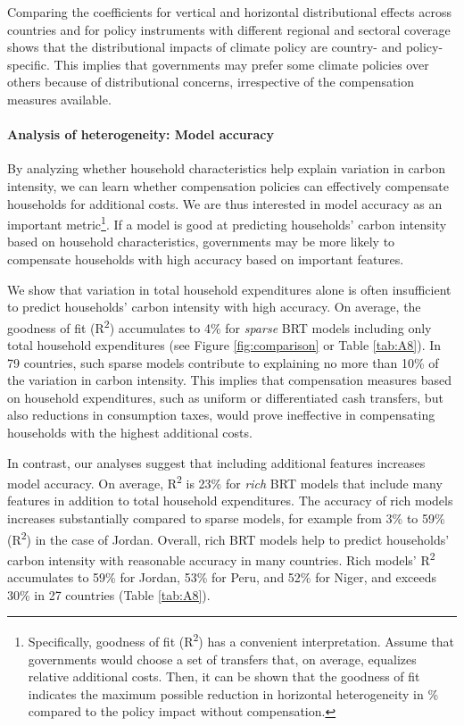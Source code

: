 \documentclass[12pt, a4paper]{article}
\begin{document}
Comparing the coefficients for vertical and horizontal distributional effects across countries and for policy instruments with different regional and sectoral coverage shows that the distributional impacts of climate policy are country- and policy-specific. This implies that governments may prefer some climate policies over others because of distributional concerns, irrespective of the compensation measures available.

\paragraph{Analysis of heterogeneity: Model accuracy} 
By analyzing whether household characteristics help explain variation in carbon intensity, we can learn whether compensation policies can effectively compensate households for additional costs. We are thus interested in model accuracy as an important metric\footnote{Specifically, goodness of fit (R\textsuperscript{2}) has a convenient interpretation. Assume that governments would choose a set of transfers that, on average, equalizes relative additional costs. Then, it can be shown that the goodness of fit indicates the maximum possible reduction in horizontal heterogeneity in \% compared to the policy impact without compensation.}. If a model is good at predicting households' carbon intensity based on household characteristics, governments may be more likely to compensate households with high accuracy based on important features. 

We show that variation in total household expenditures alone is often insufficient to predict households' carbon intensity with high accuracy. On average, the goodness of fit (R\textsuperscript{2}) accumulates to 4\% for \textit{sparse} BRT models including only total household expenditures (see Figure \ref{fig:comparison} or Table \ref{tab:A8}). In 79 countries, such sparse models contribute to explaining no more than 10\% of the variation in carbon intensity. This implies that compensation measures based on household expenditures, such as uniform or differentiated cash transfers, but also reductions in consumption taxes, would prove ineffective in compensating households with the highest additional costs.

In contrast, our analyses suggest that including additional features increases model accuracy. On average, R\textsuperscript{2} is 23\% for \textit{rich} BRT models that include many features in addition to total household expenditures. The accuracy of rich models increases substantially compared to sparse models, for example from 3\% to 59\% (R\textsuperscript{2}) in the case of Jordan. Overall, rich BRT models help to predict households' carbon intensity with reasonable accuracy in many countries. Rich models' R\textsuperscript{2} accumulates to 59\% for Jordan, 53\% for Peru, and 52\% for Niger, and exceeds 30\% in 27 countries (Table \ref{tab:A8}).
\end{document}
